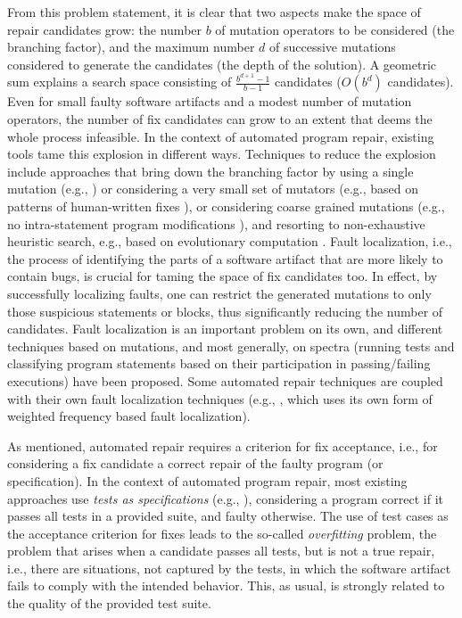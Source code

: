 \noindent
From this problem statement, it is clear that two aspects make the space of repair candidates grow: the number $b$ of mutation operators to be considered (the branching factor), and the maximum number $d$ of successive mutations considered to generate the candidates (the depth of the solution). A geometric sum explains a search space consisting of $\frac{b^{d+1}-1}{b-1}$ candidates ($O(b^d)$ candidates). Even for small faulty software artifacts and a modest number of mutation operators, the number of fix candidates can grow to an extent that deems the whole process infeasible. In the context of automated program repair, existing tools tame this explosion in different ways. Techniques to reduce the explosion include approaches that bring down the branching factor by using a single mutation (e.g., \cite{DBLP:conf/tacas/GopinathMK11}) or considering a very small set of mutators (e.g., based on patterns of human-written fixes \cite{Kim+2013}), or considering coarse grained mutations (e.g., no intra-statement program modifications \cite{LeGoues+2012}), and resorting to non-exhaustive heuristic search, e.g., based on evolutionary computation \cite{LeGoues+2012}. Fault localization, i.e., the process of identifying the parts of a software artifact that are more likely to contain bugs, is crucial for taming the space of fix candidates too. In effect, by successfully localizing faults, one can restrict the generated mutations to only those suspicious statements or blocks, thus significantly reducing the number of candidates. Fault localization is an important problem on its own, and different techniques based on mutations, and most generally, on spectra (running tests and classifying program statements based on their participation in passing/failing executions) have been proposed. Some automated repair techniques are coupled with their own fault localization techniques (e.g., \cite{LeGoues+2012}, which uses its own form of weighted frequency based fault localization). 

As mentioned, automated repair requires a criterion for fix acceptance, i.e., for considering a fix candidate a correct repair of the faulty program (or specification). In the context of automated program repair, most existing approaches use \emph{tests as specifications} (e.g., \cite{Kim+2013,LeGoues+2012}), considering a program correct if it passes all tests in a provided suite, and faulty otherwise. The use of test cases as the acceptance criterion for fixes leads to the so-called \emph{overfitting} problem, the problem that arises when a candidate passes all tests, but is not a true repair, i.e., there are situations, not captured by the tests, in which the software artifact fails to comply with the intended behavior. This, as usual, is strongly related to the quality of the provided test suite.

